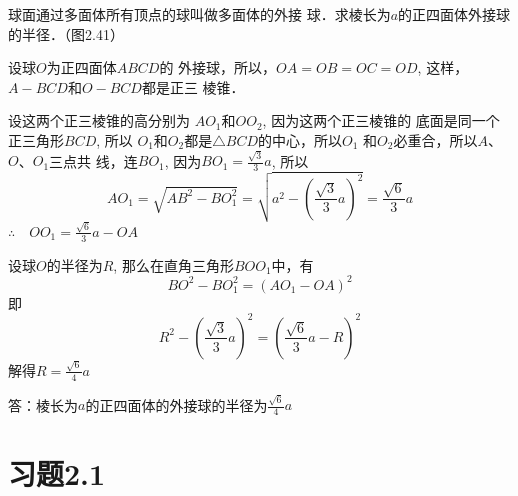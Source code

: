 \begin{example}
    球面通过多面体所有顶点的球叫做多面体的外接
球．求棱长为$a$的正四面体外接球的半径．（图2.41）
\end{example}

\begin{figure}[htp]
    \centering
{}  
    \caption{}
\end{figure}

\begin{solution}
设球$O$为正四面体$ABCD$的
外接球，所以，$OA=OB=OC=OD$, 
这样，$A-BCD$和$O-BCD$都是正三
棱锥．

设这两个正三棱锥的高分别为
$AO_1$和$OO_2$, 因为这两个正三棱锥的
底面是同一个正三角形$BCD$, 所以
$O_1$和$O_2$都是$\triangle BCD$的中心，所以$O_1$
和$O_2$必重合，所以$A$、$O$、$O_1$三点共
线，连$BO_1$, 因为$BO_1=\frac{\sqrt{3}}{3}a$, 所以
\[AO_1=\sqrt{AB^2-BO_1^2}=\sqrt{a^2-\left(\frac{\sqrt{3}}{3}a\right)^2}=\frac{\sqrt{6}}{3}a\]
$\therefore\quad OO_1=\frac{\sqrt{6}}{3}a-OA$

设球$O$的半径为$R$, 那么在直角三角形$BOO_1$中，有
\[BO^2-BO_1^2=(AO_1-OA)^2\]
即\[R^2-\left(\frac{\sqrt{3}}{3}a\right)^2=\left(\frac{\sqrt{6}}{3}a-R\right)^2\]
解得$R=\frac{\sqrt{6}}{4}a$

答：棱长为$a$的正四面体的外接球的半径为$\frac{\sqrt{6}}{4}a$
\end{solution}

\section*{习题2.1}

